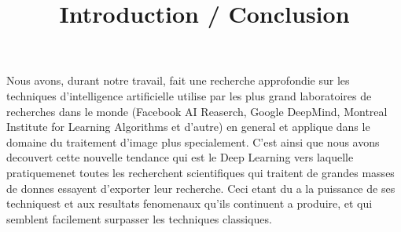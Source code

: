 
\title{Introduction / Conclusion} %

Nous avons, durant notre travail, fait une recherche approfondie sur les techniques d'intelligence artificielle utilise par les plus grand laboratoires de recherches dans le monde (Facebook AI Reaserch, Google DeepMind, Montreal Institute for Learning Algorithms et d'autre) en general et applique dans le domaine du traitement d'image plus specialement. C'est ainsi que nous avons decouvert cette nouvelle tendance qui est le Deep Learning vers laquelle pratiquemenet toutes les recherchent scientifiques qui traitent de grandes masses de donnes essayent d'exporter leur recherche. Ceci etant du a la puissance de ses techniquest et aux resultats fenomenaux qu'ils continuent a produire, et qui semblent facilement surpasser les techniques classiques.
